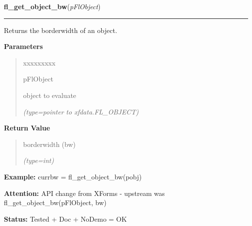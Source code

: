 \hspace{.8\funcindent}\begin{boxedminipage}{\funcwidth}

    \raggedright \textbf{fl\_get\_object\_bw}(\textit{pFlObject})

    \vspace{-1.5ex}

    \rule{\textwidth}{0.5\fboxrule}
\setlength{\parskip}{2ex}
    Returns the borderwidth of an object.

\setlength{\parskip}{1ex}
      \textbf{Parameters}
      \vspace{-1ex}

      \begin{quote}
        \begin{Ventry}{xxxxxxxxx}

          \item[pFlObject]

          object to evaluate

            {\it (type=pointer to xfdata.FL\_OBJECT)}

        \end{Ventry}

      \end{quote}

      \textbf{Return Value}
    \vspace{-1ex}

      \begin{quote}
      borderwidth (bw)

      {\it (type=int)}

      \end{quote}

\textbf{Example:} currbw = fl\_get\_object\_bw(pobj)



\textbf{Attention:} API change from XForms - upstream was fl\_get\_object\_bw(pFlObject, bw)



\textbf{Status:} Tested + Doc + NoDemo = OK



    \end{boxedminipage}

    \label{xformslib:flbasic:fl_set_object_resize}

    \vspace{0.5ex}

